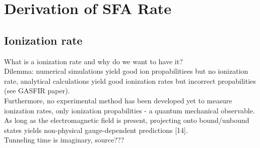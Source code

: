 \newpage
\section{Derivation of SFA Rate}






\subsection{Ionization rate}
What is a ionization rate and why do we want to have it?\\
Dilemma: numerical simulations yield good ion propabilitiees but no ionization rate, analytical calculations yield good ionization rates but incorrect propabilities (see GASFIR paper).\\
Furthermore, no experimental method has been developed yet to measure ionization rates, only ionization propabilities - a quantum mechanical observable.\\
As long as the electromagnetic
field is present, projecting onto bound/unbound states
yields non-physical gauge-dependent predictions [14].\\       %
Tunneling time is imaginary, source???\\

